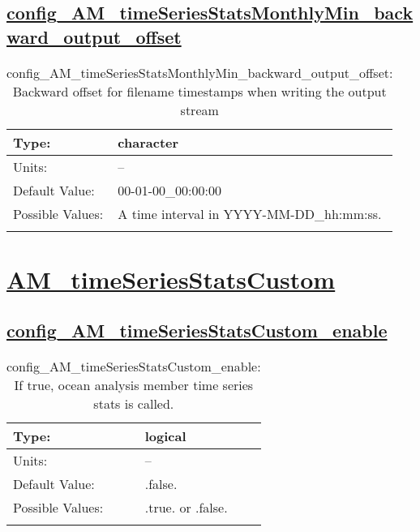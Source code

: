 \subsection[config\_AM\_timeSeriesStatsMonthlyMin\_backward\_output\_offset]{\hyperref[sec:nm_tab_AM_timeSeriesStatsMonthlyMin]{config\_AM\_timeSeriesStatsMonthlyMin\_backward\_output\_offset}}
\label{subsec:nm_sec_config_AM_timeSeriesStatsMonthlyMin_backward_output_offset}
\begin{center}
\begin{longtable}{| p{2.0in} || p{4.0in} |}
    \hline
    Type: & character \\
    \hline
    Units: & -- \\
    \hline
    Default Value: & 00-01-00\_00:00:00 \\
    \hline
    Possible Values: & A time interval in YYYY-MM-DD\_hh:mm:ss. \\
    \hline
    \caption{config\_AM\_timeSeriesStatsMonthlyMin\_backward\_output\_offset: Backward offset for filename timestamps when writing the output stream}
\end{longtable}
\end{center}
\section[AM\_timeSeriesStatsCustom]{\hyperref[sec:nm_tab_AM_timeSeriesStatsCustom]{AM\_timeSeriesStatsCustom}}
\label{sec:nm_sec_AM_timeSeriesStatsCustom}
\subsection[config\_AM\_timeSeriesStatsCustom\_enable]{\hyperref[sec:nm_tab_AM_timeSeriesStatsCustom]{config\_AM\_timeSeriesStatsCustom\_enable}}
\label{subsec:nm_sec_config_AM_timeSeriesStatsCustom_enable}
\begin{center}
\begin{longtable}{| p{2.0in} || p{4.0in} |}
    \hline
    Type: & logical \\
    \hline
    Units: & -- \\
    \hline
    Default Value: & .false. \\
    \hline
    Possible Values: & .true. or .false. \\
    \hline
    \caption{config\_AM\_timeSeriesStatsCustom\_enable: If true, ocean analysis member time series stats is called.}
\end{longtable}
\end{center}
